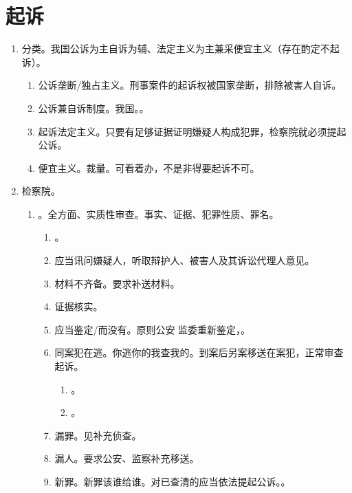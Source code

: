 \section{起诉}
\begin{enumerate}
  \item 分类。我国公诉为主自诉为辅、法定主义为主兼采便宜主义（存在酌定不起诉）。
        \begin{enumerate}
          \item 公诉垄断/独占主义。刑事案件的起诉权被国家垄断，排除被害人自诉。
          \item 公诉兼自诉制度。我国。。
          \item 起诉法定主义。只要有足够证据证明嫌疑人构成犯罪，检察院就必须提起公诉。
          \item 便宜主义。裁量。可看着办，不是非得要起诉不可。
        \end{enumerate}
  \item 检察院。
        \begin{enumerate}
          \item {}。全方面、实质性审查。事实、证据、犯罪性质、罪名。
                \begin{enumerate}
                  \item {}。
                  \item 应当讯问嫌疑人，听取辩护人、被害人及其诉讼代理人意见。
                  \item 材料不齐备。要求补送材料。
                  \item 证据核实。
                  \item 应当鉴定/而没有。原则公安 \hz 监委重新鉴定，。
                  \item 同案犯在逃。你逃你的我查我的。到案后另案移送在案犯，正常审查起诉。
                        \begin{enumerate}
                          \item {}。
                          \item {}。
                        \end{enumerate}
                  \item 漏罪。见补充侦查。
                  \item 漏人。要求公安、监察补充移送。
                  \item 新罪。新罪该谁给谁。对已查清的应当依法提起公诉。。

\end{enumerate}
\end{enumerate}
\end{enumerate}
